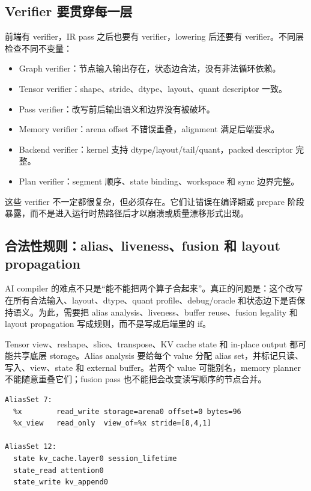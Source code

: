 \subsection{Verifier 要贯穿每一层}

前端有 verifier，IR pass 之后也要有 verifier，lowering 后还要有 verifier。不同层检查不同不变量：

\begin{itemize}
  \item Graph verifier：节点输入输出存在，状态边合法，没有非法循环依赖。
  \item Tensor verifier：shape、stride、dtype、layout、quant descriptor 一致。
  \item Pass verifier：改写前后输出语义和边界没有被破坏。
  \item Memory verifier：arena offset 不错误重叠，alignment 满足后端要求。
  \item Backend verifier：kernel 支持 dtype/layout/tail/quant，packed descriptor 完整。
  \item Plan verifier：segment 顺序、state binding、workspace 和 sync 边界完整。
\end{itemize}

这些 verifier 不一定都很复杂，但必须存在。它们让错误在编译期或 prepare 阶段暴露，而不是进入运行时热路径后才以崩溃或质量漂移形式出现。

\subsection{合法性规则：alias、liveness、fusion 和 layout propagation}

AI compiler 的难点不只是“能不能把两个算子合起来”。真正的问题是：这个改写在所有合法输入、layout、dtype、quant profile、debug/oracle 和状态边下是否保持语义。为此，需要把 alias analysis、liveness、buffer reuse、fusion legality 和 layout propagation 写成规则，而不是写成后端里的 if。

Tensor view、reshape、slice、transpose、KV cache state 和 in-place output 都可能共享底层 storage。Alias analysis 要给每个 value 分配 alias set，并标记只读、写入、view、state 和 external buffer。若两个 value 可能别名，memory planner 不能随意重叠它们；fusion pass 也不能把会改变读写顺序的节点合并。

\begin{lstlisting}[numbers=none,caption={AliasAnalysis 输出示例}]
AliasSet 7:
  %x        read_write storage=arena0 offset=0 bytes=96
  %x_view   read_only  view_of=%x stride=[8,4,1]

AliasSet 12:
  state kv_cache.layer0 session_lifetime
  state_read attention0
  state_write kv_append0
\end{lstlisting}

